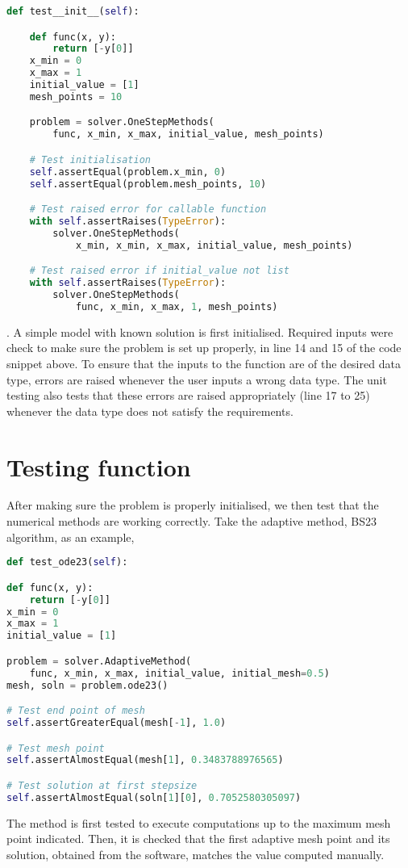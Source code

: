 \begin{lstlisting}[language=Python, caption= {initialisation testing}, title={Testing initialisation of problem}, label={code:test_init}]
def test__init__(self):

    def func(x, y):
        return [-y[0]]
    x_min = 0
    x_max = 1
    initial_value = [1]
    mesh_points = 10

    problem = solver.OneStepMethods(
        func, x_min, x_max, initial_value, mesh_points)

    # Test initialisation
    self.assertEqual(problem.x_min, 0)
    self.assertEqual(problem.mesh_points, 10)

    # Test raised error for callable function
    with self.assertRaises(TypeError):
        solver.OneStepMethods(
            x_min, x_min, x_max, initial_value, mesh_points)

    # Test raised error if initial_value not list
    with self.assertRaises(TypeError):
        solver.OneStepMethods(
            func, x_min, x_max, 1, mesh_points)
\end{lstlisting}
. A simple model with known solution is first initialised. Required inputs were check to make sure the problem is set up properly, in line 14 and 15 of the code snippet above. To ensure that the inputs to the function are of the desired data type, errors are raised whenever the user inputs a wrong data type. The unit testing also tests that these errors are raised appropriately (line 17 to 25) whenever the data type does not satisfy the requirements. 

\section{Testing function}
\label{sec:test_func}
After making sure the problem is properly initialised, we then test that the numerical methods are working correctly. Take the adaptive method, BS23 algorithm, as an example, 
\begin{lstlisting}[language=Python, caption= {testing of function}, title={Testing execution of method}, label={code:test_func}]
def test_ode23(self):

def func(x, y):
    return [-y[0]]
x_min = 0
x_max = 1
initial_value = [1]

problem = solver.AdaptiveMethod(
    func, x_min, x_max, initial_value, initial_mesh=0.5)
mesh, soln = problem.ode23()

# Test end point of mesh
self.assertGreaterEqual(mesh[-1], 1.0)

# Test mesh point
self.assertAlmostEqual(mesh[1], 0.3483788976565)

# Test solution at first stepsize
self.assertAlmostEqual(soln[1][0], 0.7052580305097)
\end{lstlisting}
The method is first tested to execute computations up to the maximum mesh point indicated. Then, it is checked that the first adaptive mesh point and its solution, obtained from the software, matches the value computed manually. 